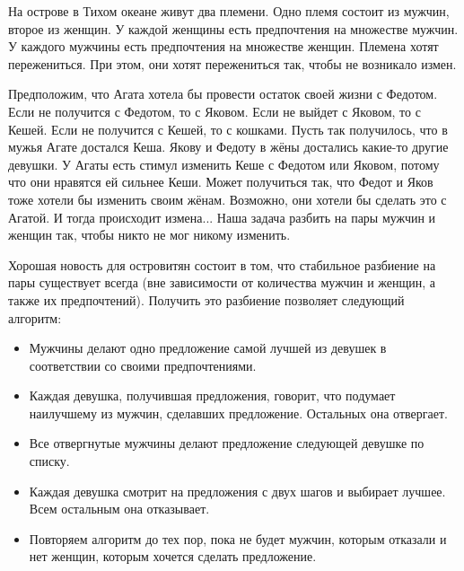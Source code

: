\documentclass[pdftex, 11pt, a4paper]{article}
\begin{document}

На острове в Тихом океане живут два племени. Одно племя состоит из мужчин, второе из женщин. У каждой женщины есть предпочтения на множестве мужчин. У каждого мужчины есть предпочтения на множестве женщин. Племена хотят пережениться. При этом, они хотят пережениться так, чтобы не возникало измен. 

Предположим, что Агата хотела бы провести остаток своей жизни с Федотом. Если не получится с Федотом, то с Яковом. Если не выйдет с Яковом, то с Кешей. Если не получится с Кешей, то с кошками. Пусть так получилось, что в мужья Агате достался Кеша. Якову и Федоту в жёны достались какие-то другие девушки. У Агаты есть стимул изменить Кеше с Федотом или Яковом, потому что они нравятся ей сильнее Кеши. Может получиться так, что Федот и Яков тоже хотели бы изменить своим жёнам. Возможно, они хотели бы сделать это с Агатой. И тогда происходит измена... Наша задача разбить на пары мужчин и женщин так, чтобы никто не мог никому изменить. 


Хорошая новость для островитян состоит в том, что стабильное разбиение на пары существует всегда (вне зависимости от количества мужчин и женщин, а также их предпочтений). Получить это разбиение позволяет следующий алгоритм: 


\begin{itemize} 
\item Мужчины делают одно предложение самой лучшей из девушек в соответствии со своими предпочтениями. 

\item Каждая девушка, получившая предложения, говорит, что подумает наилучшему из мужчин, сделавших предложение. Остальных она отвергает.

\item Все отвергнутые мужчины делают предложение следующей девушке по списку. 

\item Каждая девушка смотрит на предложения с двух шагов и выбирает лучшее. Всем остальным она отказывает.

\item Повторяем алгоритм до тех пор, пока не будет мужчин, которым отказали и нет женщин, которым хочется сделать предложение.  
\end{itemize} 
\end{document}
